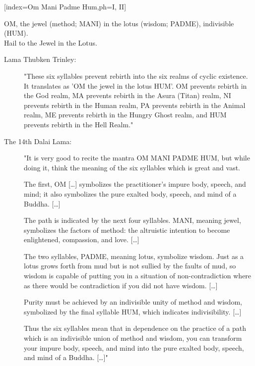 [index={Om Mani Padme Hum},ph={I, II}]
  {\small{} }
  \vspace{-2em}
  \begin{feeler}
    OM, the jewel (method; MANI) in the lotus (wisdom; PADME), indivisible (HUM).\\
    Hail to the Jewel in the Lotus.
  \end{feeler}
  \vfill
  \begin{explanation}
    \begin{description}
      \item[Lama Thubken Trinley:] "These six syllables prevent rebirth into the six realms of
        cyclic existence. It translates as 'OM the jewel in the lotus HUM'. OM prevents rebirth
        in the God realm, MA prevents rebirth in the Asura (Titan) realm, NI prevents rebirth in
        the Human realm, PA prevents rebirth in the Animal realm, ME prevents rebirth in the
        Hungry Ghost realm, and HUM prevents rebirth in the Hell Realm."
      \item[The 14th Dalai Lama:] "It is very good to recite the mantra OM MANI PADME HUM, but
        while doing it, think the meaning of the six syllables which is great and vast.\par
        The first, OM [\ldots] symbolizes the practitioner's impure body, speech, and mind; it also
        symbolizes the pure exalted body, speech, and mind of a Buddha. [\ldots]\par
        The path is indicated by the next four syllables. MANI, meaning jewel, symbolizes the
        factors of method: the altruistic intention to become enlightened, compassion, and
        love. [\ldots]\par
        The two syllables, PADME, meaning lotus, symbolize wisdom. Just as a lotus grows forth
        from mud but is not sullied by the faults of mud, so wisdom is capable of putting you in
        a situation of non-contradiction where as there would be contradiction if you did not have
        wisdom. [\ldots]\par
        Purity must be achieved by an indivisible unity of method and wisdom, symbolized by the
        final syllable HUM, which indicates indivisibility. [\ldots]\par
        Thus the six syllables mean that in dependence on the practice of a path which is an
        indivisible union of method and wisdom, you can transform your impure body, speech, and
        mind into the pure exalted body, speech, and mind of a Buddha. [\ldots]"
    \end{description}
  \end{explanation}
  \vfill%
\endsong


